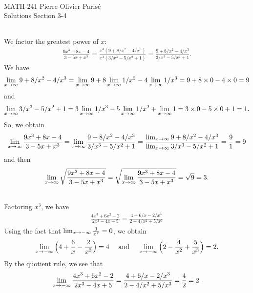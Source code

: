 


	\noindent \hrulefill \\
	MATH-241 \hfill Pierre-Olivier Paris{\'e}\\
	Solutions Section 3-4 \hfill \semester \\\vspace*{-1cm}
	
	\noindent\hrulefill
	
	\spc
	
	\\
	We factor the greatest power of $x$:
		\begin{align*}
		\frac{9x^3 + 8x - 4}{3 - 5x + x^3} = \frac{x^3 (9 + 8/x^2 - 4/x^3)}{x^3 (3/x^3 - 5/x^2 + 1)} = \frac{9 + 8/x^2 - 4/x^3}{3/x^3 - 5/x^2 + 1} .
		\end{align*}
	We have
		\begin{align*}
		\lim_{x \rightarrow \infty} 9 + 8/x^2 - 4/x^3 = \lim_{x \rightarrow \infty} 9 + 8 \lim_{x \rightarrow \infty} 1/x^2 - 4 \lim_{x \rightarrow \infty} 1/x^3 = 9 + 8\times 0 - 4 \times 0 = 9 
		\end{align*}
	and
		\begin{align*}
		\lim_{x \rightarrow \infty} 3/x^3 - 5/x^2 + 1 = 3 \lim_{x \rightarrow \infty} 1/x^3 - 5 \lim_{x \rightarrow \infty} 1/x^2 + \lim_{x \rightarrow \infty}
		 1 = 3 \times 0 - 5 \times 0 + 1 = 1 .
		\end{align*}
	So, we obtain
		\begin{align*}
		\lim_{x \rightarrow \infty} \frac{9x^3 + 8x - 4}{3 - 5x + x^3} = \lim_{x \rightarrow \infty} \frac{9 + 8/x^2 - 4/x^3}{3/x^3 - 5/x^2 + 1} = \frac{\lim_{x \rightarrow \infty} 9 + 8/x^2 - 4/x^3}{\lim_{x \rightarrow \infty} 3/x^3 - 5/x^2 + 1} = \frac{9}{1} = 9  
		\end{align*}
	and then
		\begin{align*}
		\lim_{x \rightarrow \infty} \sqrt{\frac{9x^3 + 8x - 4}{3 - 5x + x^3}} = \sqrt{\lim_{x \rightarrow \infty} \frac{9x^3 + 8x - 4}{3 - 5x + x^3}} = \sqrt{9} = 3 .
		\end{align*}
		
	\spc
	
	\\
	Factoring $x^3$, we have
		\begin{align*}
		\frac{4x^3 + 6x^2 - 2}{2x^3 - 4x + 5} = \frac{4 + 6/x - 2/x^3}{2 - 4/x^2 + 5/x^3}
		\end{align*}
	Using the fact that $\lim_{x \rightarrow -\infty} \frac{1}{x^r} = 0$, we obtain
		\begin{align*}
		\lim_{x \rightarrow -\infty} \Big( 4 + \frac{6}{x} - \frac{2}{x^3} \Big) = 4 \quad \text{ and } \quad \lim_{x \rightarrow -\infty} \Big( 2 - \frac{4}{x^2} + \frac{5}{x^3} \Big) = 2 .
		\end{align*}
	By the quotient rule, we see that
		\begin{align*}
		\lim_{x \rightarrow -\infty} \frac{4x^3 + 6x^2 - 2}{2x^3 - 4x + 5} = \frac{4 + 6/x - 2/x^3}{2 - 4/x^2 + 5/x^3} = \frac{4}{2} = 2 .
		\end{align*}
		
